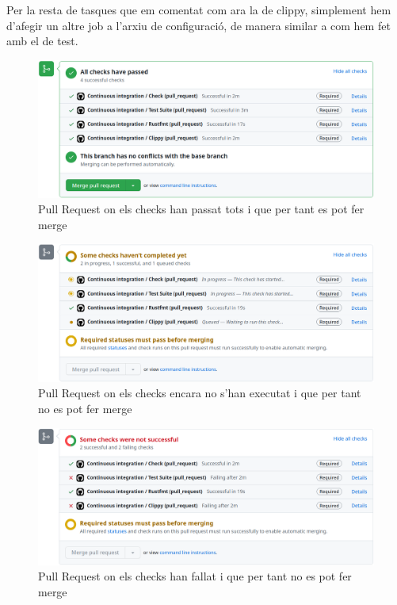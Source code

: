 ﻿\documentclass{article}
\begin{document}
Per la resta de tasques que em comentat com ara la de clippy, simplement hem 
d'afegir un altre job a l'arxiu de configuració, de manera similar a com hem 
fet amb el de test.

\begin{figure}[!htb]
    \includegraphics[width=\linewidth]{ci-pr-success.png}
    \centering
    \captionsetup{justification=centering}
    \caption{Pull Request on els checks han passat tots i que per tant es pot fer merge}
\end{figure}

\begin{figure}[!htb]
    \includegraphics[width=\linewidth]{ci-pr-inprogress.png}
    \centering
    \captionsetup{justification=centering}
    \caption{Pull Request on els checks encara no s'han executat i que per tant no es pot fer merge}
\end{figure}

\begin{figure}[!htb]
    \includegraphics[width=\linewidth]{ci-pr-fail.png}
    \centering
    \captionsetup{justification=centering}
    \caption{Pull Request on els checks han fallat i que per tant no es pot fer merge}
\end{figure}
\end{document}
